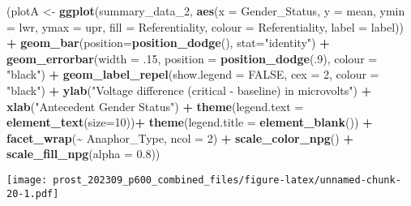 \documentclass[
  10pt,
]{article}
\newenvironment{Shaded}{\begin{snugshade}}{\end{snugshade}}
\newcommand{\AttributeTok}[1]{\textcolor[rgb]{0.13,0.29,0.53}{#1}}
\newcommand{\ConstantTok}[1]{\textcolor[rgb]{0.56,0.35,0.01}{#1}}
\newcommand{\DecValTok}[1]{\textcolor[rgb]{0.00,0.00,0.81}{#1}}
\newcommand{\FloatTok}[1]{\textcolor[rgb]{0.00,0.00,0.81}{#1}}
\newcommand{\FunctionTok}[1]{\textcolor[rgb]{0.13,0.29,0.53}{\textbf{#1}}}
\newcommand{\NormalTok}[1]{#1}
\newcommand{\OtherTok}[1]{\textcolor[rgb]{0.56,0.35,0.01}{#1}}
\newcommand{\SpecialCharTok}[1]{\textcolor[rgb]{0.81,0.36,0.00}{\textbf{#1}}}
\newcommand{\StringTok}[1]{\textcolor[rgb]{0.31,0.60,0.02}{#1}}
\begin{document}
\begin{Shaded}
\begin{Highlighting}[]
\NormalTok{(plotA }\OtherTok{\textless{}{-}} \FunctionTok{ggplot}\NormalTok{(summary\_data\_2, }\FunctionTok{aes}\NormalTok{(}\AttributeTok{x =}\NormalTok{ Gender\_Status, }
                         \AttributeTok{y =}\NormalTok{ mean,}
                         \AttributeTok{ymin =}\NormalTok{ lwr,}
                         \AttributeTok{ymax =}\NormalTok{ upr,}
                         \AttributeTok{fill =}\NormalTok{ Referentiality,}
                         \AttributeTok{colour =}\NormalTok{ Referentiality,}
                         \AttributeTok{label =}\NormalTok{ label)) }\SpecialCharTok{+} 
    \FunctionTok{geom\_bar}\NormalTok{(}\AttributeTok{position=}\FunctionTok{position\_dodge}\NormalTok{(), }\AttributeTok{stat=}\StringTok{"identity"}\NormalTok{) }\SpecialCharTok{+} 
    \FunctionTok{geom\_errorbar}\NormalTok{(}\AttributeTok{width =}\NormalTok{ .}\DecValTok{15}\NormalTok{, }\AttributeTok{position =} \FunctionTok{position\_dodge}\NormalTok{(.}\DecValTok{9}\NormalTok{), }\AttributeTok{colour =} \StringTok{"black"}\NormalTok{)  }\SpecialCharTok{+}
    \FunctionTok{geom\_label\_repel}\NormalTok{(}\AttributeTok{show.legend =} \ConstantTok{FALSE}\NormalTok{, }\AttributeTok{cex =} \DecValTok{2}\NormalTok{, }\AttributeTok{colour =} \StringTok{"black"}\NormalTok{) }\SpecialCharTok{+}
    \FunctionTok{ylab}\NormalTok{(}\StringTok{"Voltage difference (critical {-} baseline) in microvolts"}\NormalTok{) }\SpecialCharTok{+}
    \FunctionTok{xlab}\NormalTok{(}\StringTok{"Antecedent Gender Status"}\NormalTok{) }\SpecialCharTok{+}
    \FunctionTok{theme}\NormalTok{(}\AttributeTok{legend.text =} \FunctionTok{element\_text}\NormalTok{(}\AttributeTok{size=}\DecValTok{10}\NormalTok{))}\SpecialCharTok{+} 
    \FunctionTok{theme}\NormalTok{(}\AttributeTok{legend.title =} \FunctionTok{element\_blank}\NormalTok{()) }\SpecialCharTok{+}
    \FunctionTok{facet\_wrap}\NormalTok{(}\SpecialCharTok{\textasciitilde{}}\NormalTok{ Anaphor\_Type, }\AttributeTok{ncol =} \DecValTok{2}\NormalTok{) }\SpecialCharTok{+}
    \FunctionTok{scale\_color\_npg}\NormalTok{() }\SpecialCharTok{+}
    \FunctionTok{scale\_fill\_npg}\NormalTok{(}\AttributeTok{alpha =} \FloatTok{0.8}\NormalTok{))}
\end{Highlighting}
\end{Shaded}

\texttt{[image: prost\_202309\_p600\_combined\_files/figure-latex/unnamed-chunk-20-1.pdf]}
\end{document}
